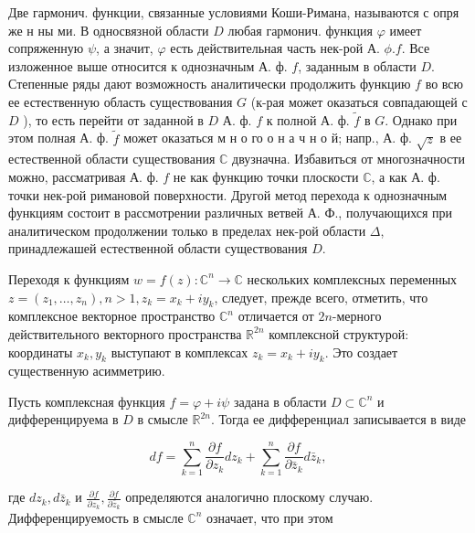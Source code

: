\documentclass[10pt]{article}
\begin{document}
Две гармонич. функции, связанные условиями Коши-Римана, называются с опря же н ны ми. В односвязной области $D$ любая гармонич. функция $\varphi$ имеет сопряженную $\psi$, а значит, $\varphi$ есть действительная часть нек-рой А. $\phi . f$. Все изложенное выше относится к однозначным А. ф. $f$, заданным в области $D$. Степенные ряды дают возможность аналитически продолжить функцию $f$ во всю ее естественную область существования $G$ (к-рая может оказаться совпадающей с $D$ ), то есть перейти от заданной в $D$ А. ф. $f$ к полной А. ф. $\tilde{f}$ в $G$. Однако при этом полная А. ф. $\tilde{f}$ может оказаться м н о го о н а ч н о й; напр., А. ф. $\sqrt{z}$ в ее естественной области существования $\mathbb{C}$ двузначна. Избавиться от многозначности можно, рассматривая А. ф. $f$ не как функцию точки плоскости $\mathbb{C}$, а как А. ф. точки нек-рой римановой поверхности. Другой метод перехода к однозначным функциям состоит в рассмотрении различных ветвей А. Ф., получающихся при аналитическом продолжении только в пределах нек-рой области $\Delta$, принадлежашей естественной области существования $D$.



Переходя к функциям $w=f(z): \mathbb{C}^{n} \rightarrow \mathbb{C}$ нескольких комплексных переменных $z=\left(z_{1}, \ldots, z_{n}\right), n>1, z_{k}=x_{k}+i y_{k}$, следует, прежде всего, отметить, что комплексное векторное пространство $\mathbb{C}^{n}$ отличается от $2 n$-мерного действительного векторного пространства $\mathbb{R}^{2 n}$ комплексной структурой: координаты $x_{k}, y_{k}$ выступают в комплексах $z_{k}=x_{k}+i y_{k}$. Это создает существенную асимметрию.



Пусть комплексная функция $f=\varphi+i \psi$ задана в области $D \subset \mathbb{C}^{n}$ и дифференцируема в $D$ в смысле $\mathbb{R}^{2 n}$. Тогда ее дифференциал записывается в виде



\[

d f=\sum_{k=1}^{n} \frac{\partial f}{\partial z_{k}} d z_{k}+\sum_{k=1}^{n} \frac{\partial f}{\partial \bar{z}_{k}} d \bar{z}_{k},

\]



где $d z_{k}, d \bar{z}_{k}$ и $\frac{\partial f}{\partial z_{k}}, \frac{\partial f}{\partial \bar{z}_{k}}$ определяются аналогично плоскому случаю. Дифференцируемость в смысле $\mathbb{C}^{n}$ означает, что при этом
\end{document}
